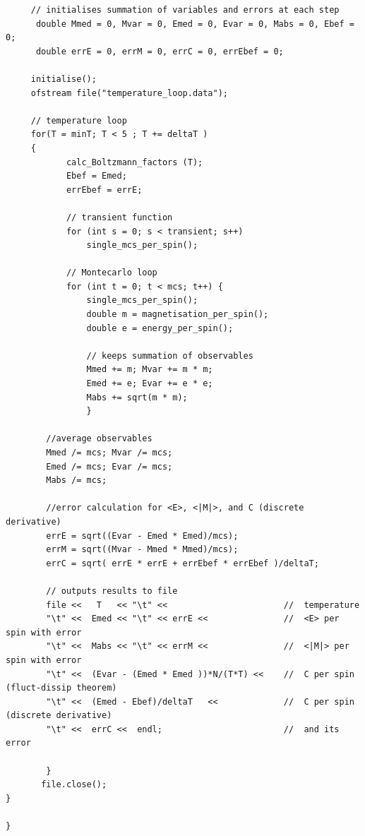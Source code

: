 \documentclass[a4paper]{article}
\begin{document}
\begin{verbatim}
     // initialises summation of variables and errors at each step
      double Mmed = 0, Mvar = 0, Emed = 0, Evar = 0, Mabs = 0, Ebef = 0;
      double errE = 0, errM = 0, errC = 0, errEbef = 0;

     initialise();
     ofstream file("temperature_loop.data");

     // temperature loop
     for(T = minT; T < 5 ; T += deltaT )
     {
            calc_Boltzmann_factors (T);
            Ebef = Emed;
            errEbef = errE;

            // transient function
            for (int s = 0; s < transient; s++)
                single_mcs_per_spin();

            // Montecarlo loop
            for (int t = 0; t < mcs; t++) {
                single_mcs_per_spin();
                double m = magnetisation_per_spin();
                double e = energy_per_spin();

                // keeps summation of observables
                Mmed += m; Mvar += m * m;
                Emed += e; Evar += e * e;
                Mabs += sqrt(m * m);
                }

        //average observables
        Mmed /= mcs; Mvar /= mcs;
        Emed /= mcs; Evar /= mcs;
        Mabs /= mcs;

        //error calculation for <E>, <|M|>, and C (discrete derivative)
        errE = sqrt((Evar - Emed * Emed)/mcs);
        errM = sqrt((Mvar - Mmed * Mmed)/mcs);
        errC = sqrt( errE * errE + errEbef * errEbef )/deltaT;

        // outputs results to file
        file <<   T   << "\t" <<                       //  temperature
        "\t" <<  Emed << "\t" << errE <<               //  <E> per spin with error
        "\t" <<  Mabs << "\t" << errM <<               //  <|M|> per spin with error
        "\t" <<  (Evar - (Emed * Emed ))*N/(T*T) <<    //  C per spin (fluct-dissip theorem)
        "\t" <<  (Emed - Ebef)/deltaT   <<             //  C per spin (discrete derivative)
        "\t" <<  errC <<  endl;                        //  and its error

        }
       file.close();
}

}
\end{verbatim}
\end{document}
